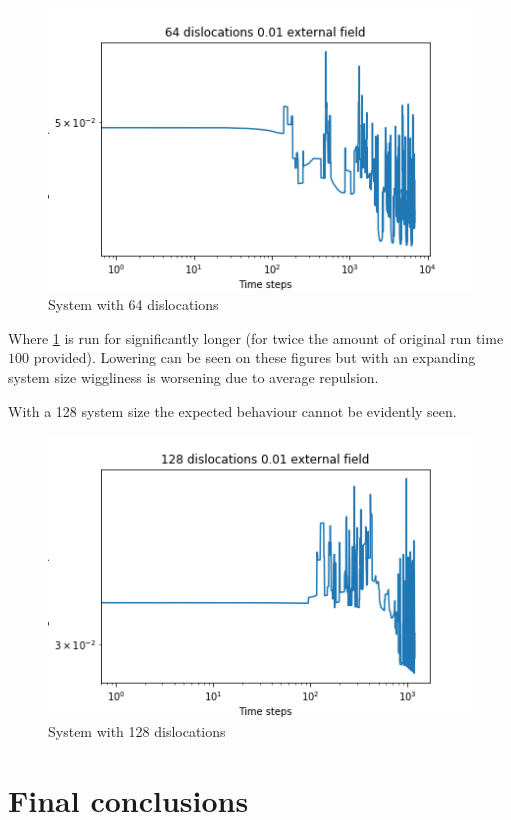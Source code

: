 \documentclass[12pt,a4paper]{article}
\theoremstyle{plain}
\begin{document}
\begin{multicols*}{2}
	\begin{figure}[H]
		\centering
		\includegraphics[width=0.8\columnwidth]{./64_long.png}
		\caption{System with 64 dislocations}
		\label{fig:64}
	\end{figure}

	\par Where \ref{fig:64} is run for significantly longer (for twice the amount of original run time $100$ provided).
	Lowering can be seen on these figures but with an expanding system size wiggliness
	is worsening due to average repulsion.

	\par With a 128 system size the expected behaviour cannot be evidently seen.

	\begin{figure}[H]
		\centering
		\includegraphics[width=0.8\columnwidth]{./128.png}
		\caption{System with 128 dislocations}
	\end{figure}

	\section{Final conclusions}


\end{multicols*}
\end{document}
